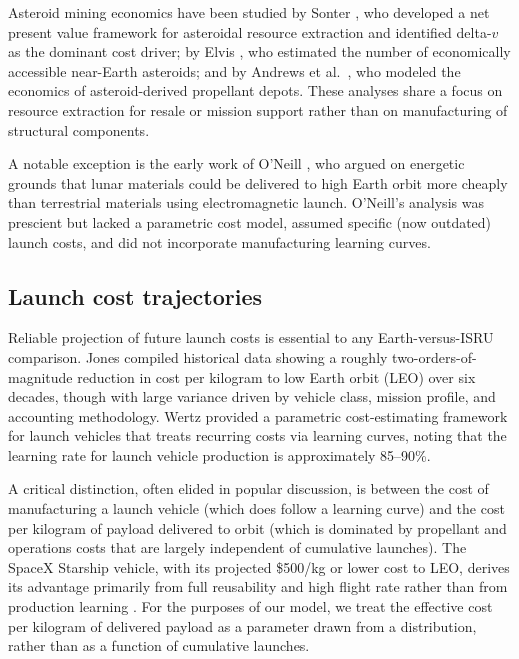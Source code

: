 \documentclass[preprint,12pt]{elsarticle}
\begin{document}
Asteroid mining economics have been studied by Sonter \cite{sonter1997}, who developed a net present value framework for asteroidal resource extraction and identified delta-$v$ as the dominant cost driver; by Elvis \cite{elvis2012}, who estimated the number of economically accessible near-Earth asteroids; and by Andrews et al.\ \cite{andrews2015}, who modeled the economics of asteroid-derived propellant depots. These analyses share a focus on resource extraction for resale or mission support rather than on manufacturing of structural components.

A notable exception is the early work of O'Neill \cite{oneill1977}, who argued on energetic grounds that lunar materials could be delivered to high Earth orbit more cheaply than terrestrial materials using electromagnetic launch. O'Neill's analysis was prescient but lacked a parametric cost model, assumed specific (now outdated) launch costs, and did not incorporate manufacturing learning curves.

\subsection{Launch cost trajectories}

Reliable projection of future launch costs is essential to any Earth-versus-ISRU comparison. Jones \cite{jones2018} compiled historical data showing a roughly two-orders-of-magnitude reduction in cost per kilogram to low Earth orbit (LEO) over six decades, though with large variance driven by vehicle class, mission profile, and accounting methodology. Wertz \cite{wertz2011} provided a parametric cost-estimating framework for launch vehicles that treats recurring costs via learning curves, noting that the learning rate for launch vehicle production is approximately 85--90\%.

A critical distinction, often elided in popular discussion, is between the cost of manufacturing a launch vehicle (which does follow a learning curve) and the cost per kilogram of payload delivered to orbit (which is dominated by propellant and operations costs that are largely independent of cumulative launches). The SpaceX Starship vehicle, with its projected \$500/kg or lower cost to LEO, derives its advantage primarily from full reusability and high flight rate rather than from production learning \cite{spacex2023}. For the purposes of our model, we treat the effective cost per kilogram of delivered payload as a parameter drawn from a distribution, rather than as a function of cumulative launches.
\end{document}
